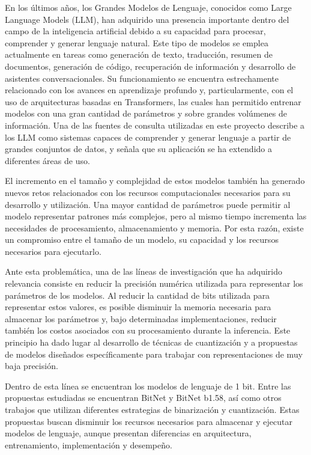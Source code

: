 
En los últimos años, los Grandes Modelos de Lenguaje, conocidos como Large Language Models (LLM), han adquirido una presencia importante dentro del campo de la inteligencia artificial debido a su capacidad para procesar, comprender y generar lenguaje natural. Este tipo de modelos se emplea actualmente en tareas como generación de texto, traducción, resumen de documentos, generación de código, recuperación de información y desarrollo de asistentes conversacionales. Su funcionamiento se encuentra estrechamente relacionado con los avances en aprendizaje profundo y, particularmente, con el uso de arquitecturas basadas en Transformers, las cuales han permitido entrenar modelos con una gran cantidad de parámetros y sobre grandes volúmenes de información. Una de las fuentes de consulta utilizadas en este proyecto describe a los LLM como sistemas capaces de comprender y generar lenguaje a partir de grandes conjuntos de datos, y señala que su aplicación se ha extendido a diferentes áreas de uso.

El incremento en el tamaño y complejidad de estos modelos también ha generado nuevos retos relacionados con los recursos computacionales necesarios para su desarrollo y utilización. Una mayor cantidad de parámetros puede permitir al modelo representar patrones más complejos, pero al mismo tiempo incrementa las necesidades de procesamiento, almacenamiento y memoria. Por esta razón, existe un compromiso entre el tamaño de un modelo, su capacidad y los recursos necesarios para ejecutarlo.

Ante esta problemática, una de las líneas de investigación que ha adquirido relevancia consiste en reducir la precisión numérica utilizada para representar los parámetros de los modelos. Al reducir la cantidad de bits utilizada para representar estos valores, es posible disminuir la memoria necesaria para almacenar los parámetros y, bajo determinadas implementaciones, reducir también los costos asociados con su procesamiento durante la inferencia. Este principio ha dado lugar al desarrollo de técnicas de cuantización y a propuestas de modelos diseñados específicamente para trabajar con representaciones de muy baja precisión.

Dentro de esta línea se encuentran los modelos de lenguaje de 1 bit. Entre las propuestas estudiadas se encuentran BitNet y BitNet b1.58, así como otros trabajos que utilizan diferentes estrategias de binarización y cuantización. Estas propuestas buscan disminuir los recursos necesarios para almacenar y ejecutar modelos de lenguaje, aunque presentan diferencias en arquitectura, entrenamiento, implementación y desempeño.

